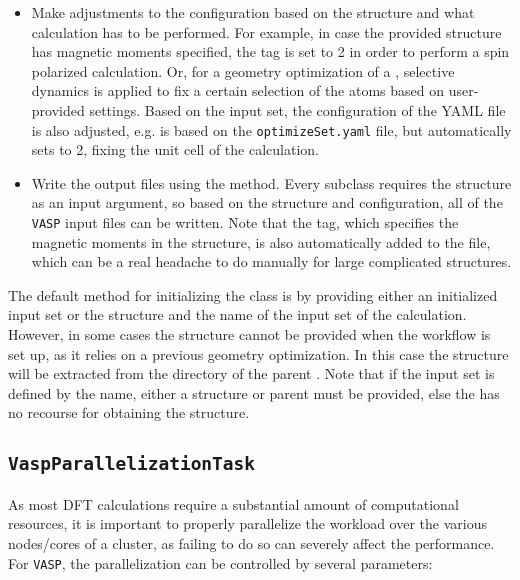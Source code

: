 \begin{refsection}
\begin{itemize}
\item Make adjustments to the configuration based on the structure and what calculation has to be performed. For example, in case the provided structure has magnetic moments specified, the  tag is set to 2 in order to perform a spin polarized calculation. Or, for a geometry optimization of a , selective dynamics is applied to fix a certain selection of the atoms based on user-provided settings. Based on the input set, the configuration of the YAML file is also adjusted, e.g.  is based on the \texttt{optimizeSet.yaml} file, but automatically sets  to 2, fixing the unit cell of the calculation.

\item Write the output files using the  method. Every  subclass requires the structure as an input argument, so based on the structure and configuration, all of the \texttt{VASP} input files can be written. Note that the  tag, which specifies the magnetic moments in the structure, is also automatically added to the  file, which can be a real headache to do manually for large complicated structures.

\end{itemize}

The default method for initializing the  class is by providing either an initialized input set or the structure and the name of the input set of the calculation. However, in some cases the structure cannot be provided when the workflow is set up, as it relies on a previous geometry optimization. In this case the structure will be extracted from the directory of the parent . Note that if the input set is defined by the name, either a structure or parent  must be provided, else the  has no recourse for obtaining the structure.

\subsection{\texttt{VaspParallelizationTask}} \label{automation:sec-VaspParallelizationTask}

As most DFT calculations require a substantial amount of computational resources, it is important to properly parallelize the workload over the various nodes/cores of a cluster, as failing to do so can severely affect the performance. For \texttt{VASP}, the parallelization can be controlled by several parameters:


\end{refsection}
